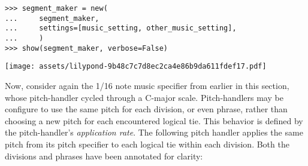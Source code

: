 \begin{comment}
<abjad>[stylesheet=../consort.ily]
segment_maker = new(
    segment_maker,
    settings=[music_setting, other_music_setting],
    )
show(segment_maker, verbose=False)
</abjad>
\end{comment}

\begin{abjadbookoutput}
\begin{singlespacing}
\vspace{-0.5\baselineskip}
\begin{lstlisting}
>>> segment_maker = new(
...     segment_maker,
...     settings=[music_setting, other_music_setting],
...     )
>>> show(segment_maker, verbose=False)
\end{lstlisting}
\noindent\texttt{[image: assets/lilypond-9b48c7c7d8ec2ca4e86b9da611fdef17.pdf]}
\end{singlespacing}
\end{abjadbookoutput}

\noindent Now, consider again the 1/16 note music specifier from earlier in
this section, whose pitch-handler cycled through a C-major scale.
Pitch-handlers may be configure to use the same pitch for each division, or
even phrase, rather than choosing a new pitch for each encountered logical tie.
This behavior is defined by the pitch-handler's \emph{application rate}. The
following pitch handler applies the same pitch from its pitch specifier to each
logical tie within each division. Both the divisions and phrases have been
annotated for clarity:

\begin{comment}
<abjad>[stylesheet=../consort.ily]
music_specifier = consort.MusicSpecifier(
    pitch_handler=consort.AbsolutePitchHandler(
        pitch_application_rate='division',
        pitch_specifier="c' d' e' f' g' a' b' c''",
        ),
    rhythm_maker=rhythmmakertools.EvenDivisionRhythmMaker(denominators=[16]),
    )
music_setting = consort.MusicSetting(
    timespan_maker=timespan_maker,
    v1=music_specifier,
    v2=music_specifier,
    )
segment_maker = new(segment_maker, settings=[music_setting])
lilypond_file = segment_maker(verbose=False)
consort.annotate(lilypond_file.score)
show(lilypond_file)
</abjad>
\end{comment}

